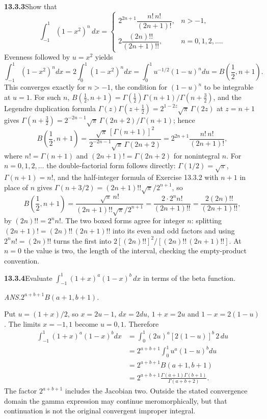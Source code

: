 \par\bigskip
\noindent\textbf{13.3.3}\quad Show that
\[
\int_{-1}^{1}(1-x^{2})^{n}\,dx=\begin{cases}
2^{2n+1}\dfrac{n!\,n!}{(2n+1)!}, & n>-1,\\[8pt]
2\dfrac{(2n)!!}{(2n+1)!!}, & n=0,1,2,\ldots.
\end{cases}
\]
\solution
Evenness followed by $u=x^2$ yields
\[
\int_{-1}^1(1-x^2)^n dx
=2\int_0^1(1-x^2)^n dx
=\int_0^1u^{-1/2}(1-u)^n du
=B\left(\frac12,n+1\right).
\]
This converges exactly for $n>-1$, the condition for $(1-u)^n$ to
be integrable at $u=1$.  For such $n$,
$B(\frac12,n+1)=\Gamma(\frac12)\Gamma(n+1)/\Gamma(n+\frac32)$, and
the Legendre duplication formula
$\Gamma(z)\Gamma(z+\frac12)=2^{1-2z}\sqrt\pi\,\Gamma(2z)$ at
$z=n+1$ gives
$\Gamma(n+\frac32)=2^{-2n-1}\sqrt\pi\,\Gamma(2n+2)/\Gamma(n+1)$;
hence
\[
B\left(\frac12,n+1\right)
=\frac{\sqrt\pi\,[\Gamma(n+1)]^2}{2^{-2n-1}\sqrt\pi\,\Gamma(2n+2)}
=\boxed{2^{2n+1}\frac{n!\,n!}{(2n+1)!}},
\]
where $n!=\Gamma(n+1)$ and $(2n+1)!=\Gamma(2n+2)$ for nonintegral
$n$.  For $n=0,1,2,\ldots$ the double-factorial form follows
directly: $\Gamma(1/2)=\sqrt\pi$, $\Gamma(n+1)=n!$, and the
half-integer formula of Exercise 13.3.2 with $n+1$ in place of
$n$ gives $\Gamma(n+3/2)=(2n+1)!!\sqrt\pi/2^{n+1}$, so
\[
B\left(\frac12,n+1\right)
=\frac{\sqrt\pi\,n!}{(2n+1)!!\sqrt\pi/2^{n+1}}
=\frac{2\cdot2^nn!}{(2n+1)!!}
=\boxed{\frac{2(2n)!!}{(2n+1)!!}},
\]
by $(2n)!!=2^nn!$.  The two boxed forms agree for integer $n$:
splitting $(2n+1)!=(2n)!!\,(2n+1)!!$ into its even and odd factors
and using $2^nn!=(2n)!!$ turns the first into
$2[(2n)!!]^2/[(2n)!!\,(2n+1)!!]$.  At $n=0$ the value is two, the
length of the interval, checking the empty-product convention.


\par\bigskip
\noindent\textbf{13.3.4}\quad Evaluate
$\displaystyle\int_{-1}^{1}(1+x)^{a}(1-x)^{b}\,dx$ in terms of the beta
function.
\par\nobreak\hfill\emph{ANS.}\enspace $2^{a+b+1}B(a+1,b+1)$.
\par\smallskip
{}
\solution
{}
Put $u=(1+x)/2$, so $x=2u-1$, $dx=2du$,
$1+x=2u$ and $1-x=2(1-u)$.  The limits $x=-1,1$ become
$u=0,1$.  Therefore
\begin{align*}
\int_{-1}^1(1+x)^a(1-x)^b dx
&=\int_0^1(2u)^a[2(1-u)]^b\,2\,du\\
&=2^{a+b+1}\int_0^1u^a(1-u)^bdu\\
&=\boxed{2^{a+b+1}B(a+1,b+1)}\\
&=2^{a+b+1}\frac{\Gamma(a+1)\Gamma(b+1)}{\Gamma(a+b+2)}.
\end{align*}
The factor $2^{a+b+1}$ includes the Jacobian two.  Outside the
stated convergence domain the gamma expression may continue
meromorphically, but that continuation is not the original
convergent improper integral.


